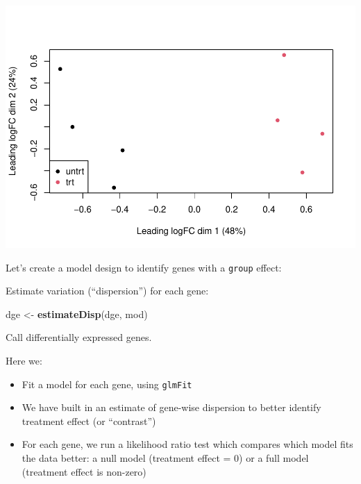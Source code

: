\documentclass[
]{book}
\newenvironment{Shaded}{\begin{snugshade}}{\end{snugshade}}
\newcommand{\FunctionTok}[1]{\textcolor[rgb]{0.13,0.29,0.53}{\textbf{#1}}}
\newcommand{\NormalTok}[1]{#1}
\newcommand{\OtherTok}[1]{\textcolor[rgb]{0.56,0.35,0.01}{#1}}
\newcommand{\SpecialCharTok}[1]{\textcolor[rgb]{0.81,0.36,0.00}{\textbf{#1}}}
\providecommand{\tightlist}{%
  \setlength{\itemsep}{0pt}\setlength{\parskip}{0pt}}
\begin{document}
\includegraphics{_main_files/figure-latex/unnamed-chunk-96-1.pdf}

Let's create a model design to identify genes with a \texttt{group} effect:

\begin{Shaded}
\end{Shaded}

Estimate variation (``dispersion'') for each gene:

\begin{Shaded}
\begin{Highlighting}[]
\NormalTok{dge }\OtherTok{\textless{}{-}} \FunctionTok{estimateDisp}\NormalTok{(dge, mod)}
\end{Highlighting}
\end{Shaded}

Call differentially expressed genes.

Here we:

\begin{itemize}
\tightlist
\item
  Fit a model for each gene, using \texttt{glmFit}
\item
  We have built in an estimate of gene-wise dispersion to better identify treatment effect (or ``contrast'')
\item
  For each gene, we run a likelihood ratio test which compares which model fits the data better: a null model (treatment effect = 0) or a full model (treatment effect is non-zero)
\end{itemize}
\end{document}
